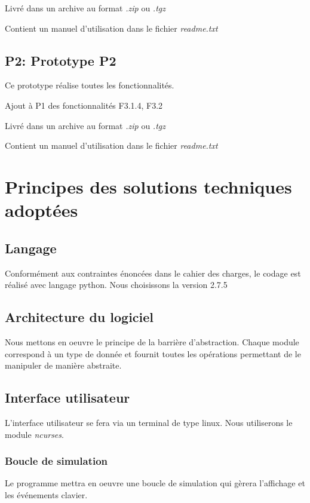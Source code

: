 \documentclass[a4paper]{article}
\begin{document}
        Livré dans un archive au format \emph{.zip} ou \emph{.tgz}
        
        Contient un manuel d'utilisation dans le fichier \emph{readme.txt}
        \subsection{P2: Prototype P2}
        Ce prototype réalise toutes les fonctionnalités.
        
        Ajout à P1 des fonctionnalités F3.1.4, F3.2
        
        Livré dans un archive au format \emph{.zip} ou \emph{.tgz}
        
        Contient un manuel d'utilisation dans le fichier \emph{readme.txt}
        \newpage
        
    \section{Principes des solutions techniques adoptées}
        \subsection{Langage}
        Conformément aux contraintes énoncées dans le cahier des charges, le codage est réalisé
        avec langage python. Nous choisissons la version 2.7.5

        \subsection{Architecture du logiciel}
        Nous mettons en oeuvre le principe de la barrière d'abstraction. Chaque module correspond
        à un type de donnée et fournit toutes les opérations permettant de le manipuler de manière
        abstraite.

        \subsection{Interface utilisateur}
        L'interface utilisateur se fera via un terminal de type linux. Nous utiliserons le module \emph{ncurses}.

            \subsubsection{Boucle de simulation}
            Le programme mettra en oeuvre une boucle de simulation qui gèrera l'affichage et les
            événements clavier.
\end{document}
